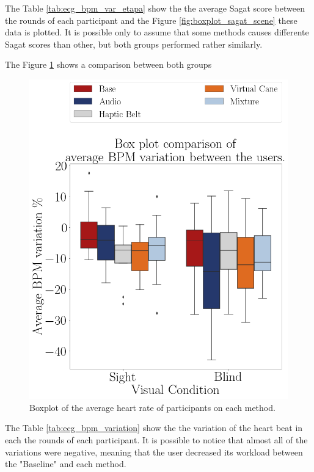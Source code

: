 The Table \ref{tab:ecg_bpm_var_etapa} show the the average Sagat score between the rounds of each participant and the Figure \ref{fig:boxplot_sagat_scene} these data is plotted. It is possible only to assume that some methods causes differente Sagat scores than other, but both groups performed rather similarly.



The Figure \ref{fig:boxplot_ecg_bpm_scene} shows a comparison between both groups

\begin{figure}[!htb]
    \centering
    \includegraphics[width = 0.5\linewidth]{Resultados/ECG/Figuras/png/boxplot_ecg_bpm_scene.png}
    \caption{Boxplot of the average heart rate of participants on each method.}
    \label{fig:boxplot_ecg_bpm_scene}
\end{figure}

The Table \ref{tab:ecg_bpm_variation} show the the variation of the heart beat in each the rounds of each participant. It is possible to notice that almost all of the variations were negative, meaning that the user decreased its workload between the "Baseline" and each method.


